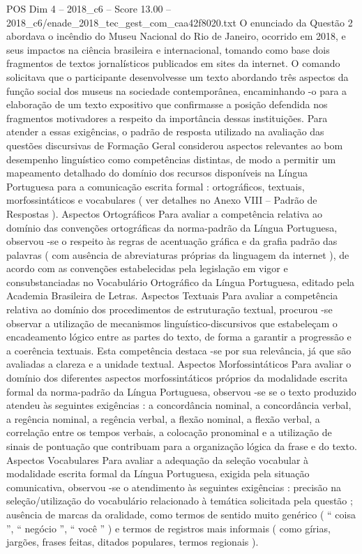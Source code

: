 \begin{textsample}{POS Dim 4 – 2018\_c6 – Score 13.00 – 2018\_c6/enade\_2018\_tec\_gest\_com\_caa42f8020.txt}
O enunciado da Questão 2 abordava o incêndio do Museu Nacional do Rio de Janeiro, ocorrido em 2018, e seus impactos na ciência brasileira e internacional, tomando como base dois fragmentos de textos jornalísticos publicados em sites da internet.
O comando solicitava que o participante desenvolvesse um texto abordando três aspectos da função social dos museus na sociedade contemporânea, encaminhando -o para a elaboração de um texto expositivo que confirmasse a posição defendida nos fragmentos motivadores a respeito da importância dessas instituições.
Para atender a essas exigências, o padrão de resposta utilizado na avaliação das questões discursivas de Formação Geral considerou aspectos relevantes ao bom desempenho linguístico como competências distintas, de modo a permitir um mapeamento detalhado do domínio dos recursos disponíveis na Língua Portuguesa para a comunicação escrita formal : ortográficos, textuais, morfossintáticos e vocabulares ( ver detalhes no Anexo VIII – Padrão de Respostas ).
Aspectos Ortográficos Para avaliar a competência relativa ao domínio das convenções ortográficas da norma-padrão da Língua Portuguesa, observou -se o respeito às regras de acentuação gráfica e da grafia padrão das palavras ( com ausência de abreviaturas próprias da linguagem da internet ), de acordo com as convenções estabelecidas pela legislação em vigor e consubstanciadas no Vocabulário Ortográfico da Língua Portuguesa, editado pela Academia Brasileira de Letras.
Aspectos Textuais Para avaliar a competência relativa ao domínio dos procedimentos de estruturação textual, procurou -se observar a utilização de mecanismos linguístico-discursivos que estabeleçam o encadeamento lógico entre as partes do texto, de forma a garantir a progressão e a coerência textuais.
Esta competência destaca -se por sua relevância, já que são avaliadas a clareza e a unidade textual.
Aspectos Morfossintáticos Para avaliar o domínio dos diferentes aspectos morfossintáticos próprios da modalidade escrita formal da norma-padrão da Língua Portuguesa, observou -se se o texto produzido atendeu às seguintes exigências : a concordância nominal, a concordância verbal, a regência nominal, a regência verbal, a flexão nominal, a flexão verbal, a correlação entre os tempos verbais, a colocação pronominal e a utilização de sinais de pontuação que contribuam para a organização lógica da frase e do texto.
Aspectos Vocabulares Para avaliar a adequação da seleção vocabular à modalidade escrita formal da Língua Portuguesa, exigida pela situação comunicativa, observou -se o atendimento às seguintes exigências : precisão na seleção/utilização do vocabulário relacionado à temática solicitada pela questão ; ausência de marcas da oralidade, como termos de sentido muito genérico ( “ coisa ”, “ negócio ”, “ você ” ) e termos de registros mais informais ( como gírias, jargões, frases feitas, ditados populares, termos regionais ).

\end{textsample}
